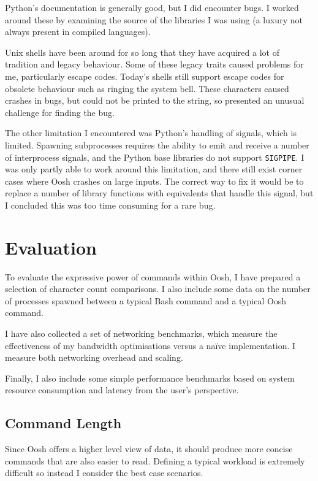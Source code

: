 \documentclass[12pt,twoside,notitlepage]{report}
\begin{document}
Python's documentation is generally good, but I did encounter bugs. I
worked around these by examining the source of the libraries I was
using (a luxury not always present in compiled languages).

Unix shells have been around for so long that they have acquired a lot
of tradition and legacy behaviour. Some of these legacy traits caused
problems for me, particularly escape codes. Today's shells still
support escape codes for obsolete behaviour such as ringing the system
bell. These characters caused crashes in bugs, but could not be
printed to the string, so presented an unusual challenge for finding
the bug.

The other limitation I encountered was Python's handling of signals,
which is limited. Spawning subprocesses requires the ability to emit
and receive a number of interprocess signals, and the Python base
libraries do not support {\tt SIGPIPE}. I was only partly able to work
around this limitation, and there still exist corner cases where Oosh
crashes on large inputs. The correct way to fix it would be to replace
a number of library functions with equivalents that handle this
signal, but I concluded this was too time consuming for a rare bug.

\cleardoublepage

\chapter{Evaluation}
To evaluate the expressive power of commands within Oosh, I have prepared a
selection of character count comparisons. I also include some data on the
number of processes spawned between a typical Bash command and a typical Oosh
command.

I have also collected a set of networking benchmarks, which measure the
effectiveness of my bandwidth optimisations versus a na\"{i}ve implementation. I
measure both networking overhead and scaling.

Finally, I also include some simple performance benchmarks based on system
resource consumption and latency from the user's perspective.

\section{Command Length}
\label{commandlength}
Since Oosh offers a higher level view of data, it should produce more concise
commands that are also easier to read. Defining a typical workload is extremely
difficult so instead I consider the best case scenarios.
\end{document}
